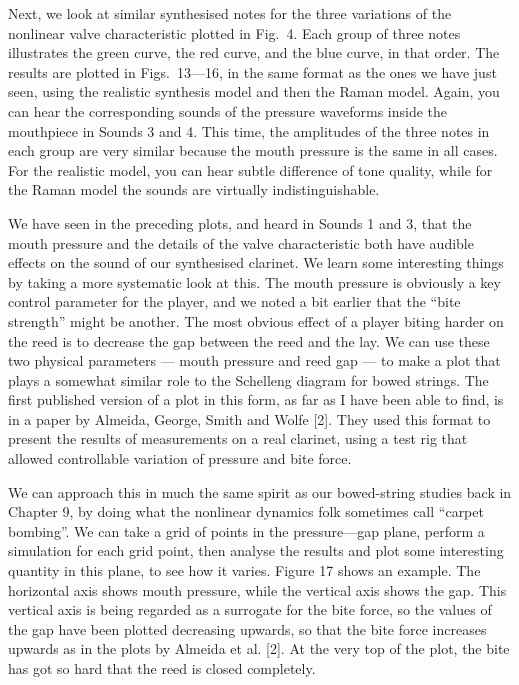   Next, we look at similar synthesised notes for the three variations of the 
  nonlinear valve characteristic plotted in Fig.\ 4. Each group of three notes 
  illustrates the green curve, the red curve, and the blue curve, in that 
  order. The results are plotted in Figs.\ 13—16, in the same format as the 
  ones we have just seen, using the realistic synthesis model and then the 
  Raman model. Again, you can hear the corresponding sounds of the pressure 
  waveforms inside the mouthpiece in Sounds 3 and 4. This time, the amplitudes 
  of the three notes in each group are very similar because the mouth pressure 
  is the same in all cases. For the realistic model, you can hear subtle 
  difference of tone quality, while for the Raman model the sounds are 
  virtually indistinguishable. 


  We have seen in the preceding plots, and heard in Sounds 1 and 3, that the 
  mouth pressure and the details of the valve characteristic both have audible 
  effects on the sound of our synthesised clarinet. We learn some interesting 
  things by taking a more systematic look at this. The mouth pressure is 
  obviously a key control parameter for the player, and we noted a bit earlier 
  that the “bite strength” might be another. The most obvious effect of a 
  player biting harder on the reed is to decrease the gap between the reed and 
  the lay. We can use these two physical parameters — mouth pressure and reed 
  gap — to make a plot that plays a somewhat similar role to the Schelleng 
  diagram for bowed strings. The first published version of a plot in this 
  form, as far as I have been able to find, is in a paper by Almeida, George, 
  Smith and Wolfe [2]. They used this format to present the results of 
  measurements on a real clarinet, using a test rig that allowed controllable 
  variation of pressure and bite force. 

  We can approach this in much the same spirit as our bowed-string studies back 
  in Chapter 9, by doing what the nonlinear dynamics folk sometimes call 
  “carpet bombing”. We can take a grid of points in the pressure—gap plane, 
  perform a simulation for each grid point, then analyse the results and plot 
  some interesting quantity in this plane, to see how it varies. Figure 17 
  shows an example. The horizontal axis shows mouth pressure, while the 
  vertical axis shows the gap. This vertical axis is being regarded as a 
  surrogate for the bite force, so the values of the gap have been plotted 
  decreasing upwards, so that the bite force increases upwards as in the plots 
  by Almeida et al. [2]. At the very top of the plot, the bite has got so hard 
  that the reed is closed completely. 

